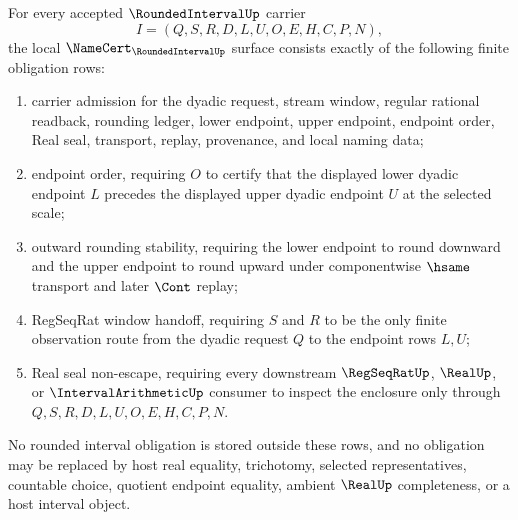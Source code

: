 \begin{theorem}
\label{thm:rounded-interval-namecert-obligations}
For every accepted $\RoundedIntervalUp$ carrier
$$
I=(Q,S,R,D,L,U,O,E,H,C,P,N),
$$
the local $\NameCert_{\RoundedIntervalUp}$ surface consists exactly of the following finite obligation rows:
\begin{enumerate}
\item carrier admission for the dyadic request, stream window, regular rational readback, rounding ledger, lower endpoint, upper endpoint, endpoint order, Real seal, transport, replay, provenance, and local naming data;
\item endpoint order, requiring $O$ to certify that the displayed lower dyadic endpoint $L$ precedes the displayed upper dyadic endpoint $U$ at the selected scale;
\item outward rounding stability, requiring the lower endpoint to round downward and the upper endpoint to round upward under componentwise $\hsame$ transport and later $\Cont$ replay;
\item RegSeqRat window handoff, requiring $S$ and $R$ to be the only finite observation route from the dyadic request $Q$ to the endpoint rows $L,U$;
\item Real seal non-escape, requiring every downstream $\RegSeqRatUp$, $\RealUp$, or $\IntervalArithmeticUp$ consumer to inspect the enclosure only through $Q,S,R,D,L,U,O,E,H,C,P,N$.
\end{enumerate}
No rounded interval obligation is stored outside these rows, and no obligation may be replaced by host real equality, trichotomy, selected representatives, countable choice, quotient endpoint equality, ambient $\RealUp$ completeness, or a host interval object.
\end{theorem}
